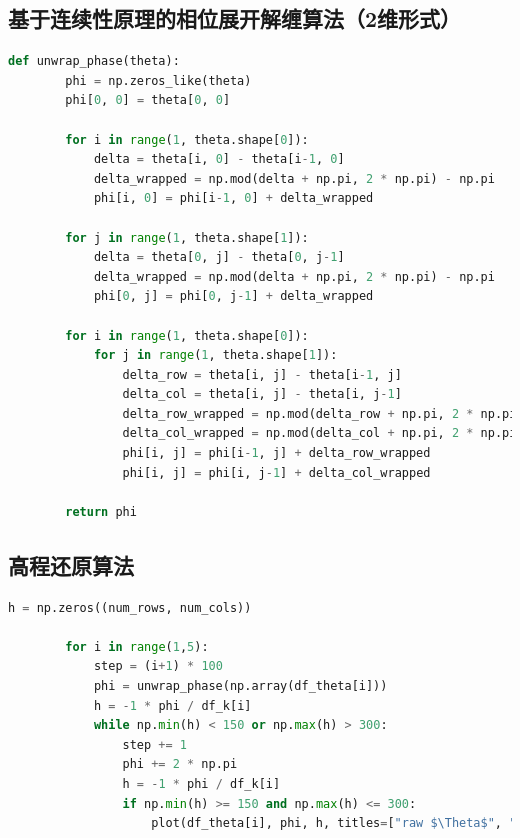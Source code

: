 \documentclass[a4paper]{article}
\begin{document}
	\subsection{基于连续性原理的相位展开解缠算法（2维形式）}
	\begin{lstlisting}[language=python,columns=fullflexible,frame=shadowbox]
		def unwrap_phase(theta):
		phi = np.zeros_like(theta)
		phi[0, 0] = theta[0, 0]
		
		for i in range(1, theta.shape[0]):
			delta = theta[i, 0] - theta[i-1, 0]
			delta_wrapped = np.mod(delta + np.pi, 2 * np.pi) - np.pi
			phi[i, 0] = phi[i-1, 0] + delta_wrapped

		for j in range(1, theta.shape[1]):
			delta = theta[0, j] - theta[0, j-1]
			delta_wrapped = np.mod(delta + np.pi, 2 * np.pi) - np.pi
			phi[0, j] = phi[0, j-1] + delta_wrapped

		for i in range(1, theta.shape[0]):
			for j in range(1, theta.shape[1]):
				delta_row = theta[i, j] - theta[i-1, j]
				delta_col = theta[i, j] - theta[i, j-1]
				delta_row_wrapped = np.mod(delta_row + np.pi, 2 * np.pi) - np.pi
				delta_col_wrapped = np.mod(delta_col + np.pi, 2 * np.pi) - np.pi
				phi[i, j] = phi[i-1, j] + delta_row_wrapped
				phi[i, j] = phi[i, j-1] + delta_col_wrapped
				
		return phi	
	\end{lstlisting}

	\subsection{高程还原算法}
	\begin{lstlisting}[language=python,columns=fullflexible,frame=shadowbox]
		h = np.zeros((num_rows, num_cols))

		for i in range(1,5):
			step = (i+1) * 100
			phi = unwrap_phase(np.array(df_theta[i]))
			h = -1 * phi / df_k[i]
			while np.min(h) < 150 or np.max(h) > 300:
				step += 1
				phi += 2 * np.pi
				h = -1 * phi / df_k[i]
				if np.min(h) >= 150 and np.max(h) <= 300:
					plot(df_theta[i], phi, h, titles=["raw $\Theta$", "new $\phi$", f"{step}"])		
	\end{lstlisting}
\end{document}
